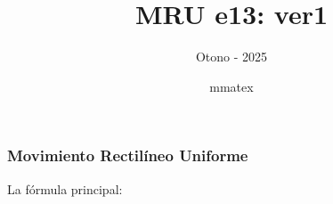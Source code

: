 \documentclass{beamer}
\title{MRU e13: ver1}
\subtitle{Otono - 2025}
\author{mmatex}
\begin{document}
\maketitle


\begin{frame}
\frametitle{Movimiento Rectil\'ineo Uniforme}
% 
 La f\'ormula principal:

                                                               
 
{\huge \vmru}
\vNUa
                                                               
                                                               
                                                               
                                                               
\end{frame}
\end{document}
